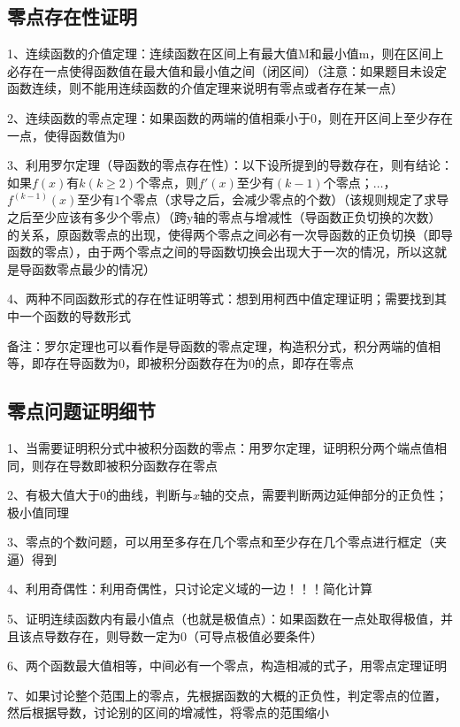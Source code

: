 \subsection{零点存在性证明}

1、连续函数的介值定理：连续函数在区间上有最大值M和最小值m，则在区间上必存在一点使得函数值在最大值和最小值之间（闭区间）（注意：如果题目未设定函数连续，则不能用连续函数的介值定理来说明有零点或者存在某一点）

2、连续函数的零点定理：如果函数的两端的值相乘小于0，则在开区间上至少存在一点，使得函数值为0

3、利用罗尔定理（导函数的零点存在性）：以下设所提到的导数存在，则有结论：如果$ f(x) $有$ k(k≥2) $个零点，则$ f'(x) $至少有$ (k-1) $个零点；$ … $，$ f^{(k-1)}(x) $至少有$ 1 $个零点（求导之后，会减少零点的个数）（该规则规定了求导之后至少应该有多少个零点）（跨y轴的零点与增减性（导函数正负切换的次数）的关系，原函数零点的出现，使得两个零点之间必有一次导函数的正负切换（即导函数的零点），由于两个零点之间的导函数切换会出现大于一次的情况，所以这就是导函数零点最少的情况）

4、两种不同函数形式的存在性证明等式：想到用柯西中值定理证明；需要找到其中一个函数的导数形式

备注：罗尔定理也可以看作是导函数的零点定理，构造积分式，积分两端的值相等，即存在导函数为0，即被积分函数存在为0的点，即存在零点



\subsection{零点问题证明细节}

1、当需要证明积分式中被积分函数的零点：用罗尔定理，证明积分两个端点值相同，则存在导数即被积分函数存在零点

2、有极大值大于0的曲线，判断与$ x $轴的交点，需要判断两边延伸部分的正负性；极小值同理

3、零点的个数问题，可以用至多存在几个零点和至少存在几个零点进行框定（夹逼）得到

4、利用奇偶性：利用奇偶性，只讨论定义域的一边！！！简化计算

5、证明连续函数内有最小值点（也就是极值点）：如果函数在一点处取得极值，并且该点导数存在，则导数一定为0（可导点极值必要条件）

6、两个函数最大值相等，中间必有一个零点，构造相减的式子，用零点定理证明

7、如果讨论整个范围上的零点，先根据函数的大概的正负性，判定零点的位置，然后根据导数，讨论别的区间的增减性，将零点的范围缩小

